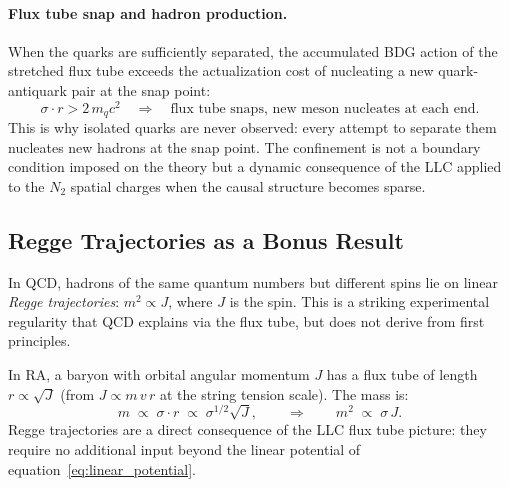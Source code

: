 \documentclass[11pt,a4paper]{article}
\begin{document}
\paragraph{Flux tube snap and hadron production.}
When the quarks are sufficiently separated, the accumulated BDG action of
the stretched flux tube exceeds the actualization cost of nucleating a new
quark-antiquark pair at the snap point:
\begin{equation}
  \sigma \cdot r > 2\,m_q c^2
  \quad\Rightarrow\quad
  \text{flux tube snaps, new meson nucleates at each end.}
  \label{eq:flux_snap}
\end{equation}
This is why isolated quarks are never observed: every attempt to separate them
nucleates new hadrons at the snap point. The confinement is not a boundary
condition imposed on the theory but a dynamic consequence of the LLC applied
to the $N_2$ spatial charges when the causal structure becomes sparse.

\subsection{Regge Trajectories as a Bonus Result}
\label{sec:regge_trajectories}

In QCD, hadrons of the same quantum numbers but different spins lie on linear
\emph{Regge trajectories}: $m^2 \propto J$, where $J$ is the spin. This is
a striking experimental regularity that QCD explains via the flux tube, but
does not derive from first principles.

In RA, a baryon with orbital angular momentum $J$ has a flux tube of length
$r \propto \sqrt{J}$ (from $J \propto m\,v\,r$ at the string tension scale).
The mass is:
\begin{equation}
  m \;\propto\; \sigma \cdot r \;\propto\; \sigma^{1/2} \sqrt{J},
  \qquad\Rightarrow\qquad
  m^2 \;\propto\; \sigma\, J.
  \label{eq:regge}
\end{equation}
Regge trajectories are a direct consequence of the LLC flux tube picture:
they require no additional input beyond the linear potential of
equation~\eqref{eq:linear_potential}.
\end{document}
